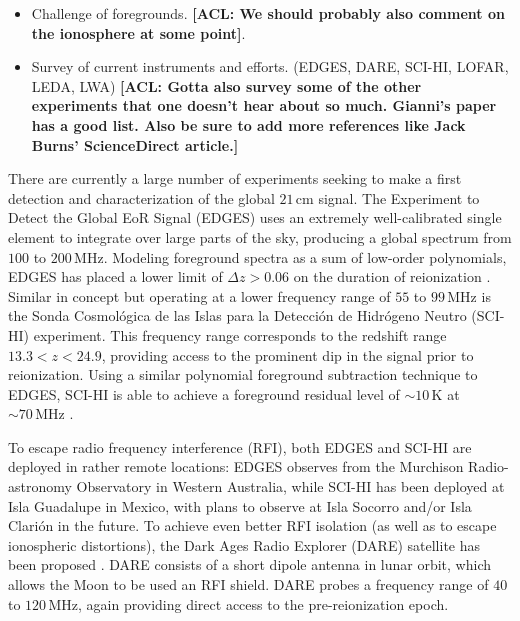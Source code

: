 \documentclass[twolcolumn,apj,iop,numberedappendix]{emulateapj}
\newcommand{\acl}[1]{{\color{red} \textbf{[ACL:  #1]}}}
\begin{document}
\begin{itemize}
\item Challenge of foregrounds.  \acl{We should probably also comment on the ionosphere at some point}.
\item Survey of current instruments and efforts. (EDGES, DARE, SCI-HI, LOFAR, LEDA, LWA) \acl{Gotta also survey some of the other experiments that one doesn't hear about so much.  Gianni's paper has a good list.  Also be sure to add more references like Jack Burns' ScienceDirect article.}
\end{itemize}
There are currently a large number of experiments seeking to make a first detection and characterization of the global $21\,\textrm{cm}$ signal.  The Experiment to Detect the Global EoR Signal (EDGES) uses an extremely well-calibrated single element \citep{rogersCalib} to integrate over large parts of the sky, producing a global spectrum from $100$ to $200\,\textrm{MHz}$.  Modeling foreground spectra as a sum of low-order polynomials, EDGES has placed a lower limit of $\Delta z > 0.06$ on the duration of reionization \citep{bowmanRogersMeasurement}.  Similar in concept but operating at a lower frequency range of $55$ to $99\,\textrm{MHz}$ is the Sonda Cosmol\'{o}gica de las Islas para la Detecci\'{o}n de Hidr\'{o}geno Neutro (SCI-HI) experiment.  This frequency range corresponds to the redshift range $13.3 < z < 24.9$, providing access to the prominent dip in the signal prior to reionization.  Using a similar polynomial foreground subtraction technique to EDGES, SCI-HI is able to achieve a foreground residual level of $\sim 10\,\textrm{K}$ at $\sim 70 \,\textrm{MHz}$ \citep{voytekSCIHI}.

To escape radio frequency interference (RFI), both EDGES and SCI-HI are deployed in rather remote locations: EDGES observes from the Murchison Radio-astronomy Observatory in Western Australia, while SCI-HI has been deployed at Isla Guadalupe in Mexico, with plans to observe at Isla Socorro and/or Isla Clari\'{o}n in the future.  To achieve even better RFI isolation (as well as to escape ionospheric distortions), the Dark Ages Radio Explorer (DARE) satellite has been proposed \citep{DAREMCMC}.  DARE consists of a short dipole antenna in lunar orbit, which allows the Moon to be used an RFI shield.  DARE probes a frequency range of $40$ to $120\,\textrm{MHz}$, again providing direct access to the pre-reionization epoch.
\end{document}
